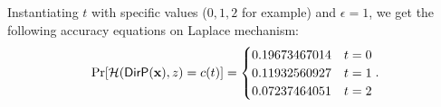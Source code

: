 \documentclass{article}
\begin{document}
Instantiating $t$ with specific values ($0,1,2$ for example) and $\epsilon = 1$, we get the following accuracy equations on Laplace mechanism:
\[
\Pr[\mathcal{H}(\mathsf{DirP}(\textbf{x}), z ) = c(t)]
= \begin{cases}
0.19673467014 & t = 0\\
0.11932560927 & t = 1\\
0.07237464051 & t = 2
\end{cases}.
\]
\end{document}
